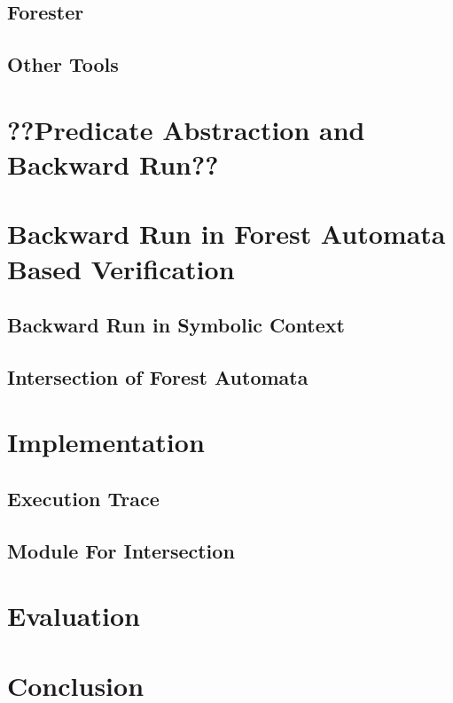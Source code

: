 \section{Forester}

\section{Other Tools}

\chapter{??Predicate Abstraction and Backward Run??}

\chapter{Backward Run in Forest Automata Based Verification}

\section{Backward Run in Symbolic Context}

\section{Intersection of Forest Automata}

\chapter{Implementation}

\section{Execution Trace}
\section{Module For Intersection}

\chapter{Evaluation}

\chapter{Conclusion}
